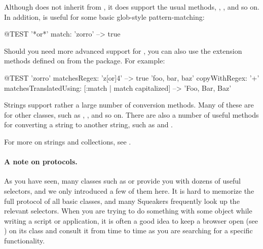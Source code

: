 \documentclass[a4paper,10pt,twoside]{book}
\begin{document}

Although  does not inherit from , it does support the usual  methods, \ct{<}, \ct{=}, and so on.
In addition,  is useful for some basic glob-style pattern-matching:

\begin{code}{@TEST}
'*or*' match: 'zorro' --> true
\end{code}

Should you need more advanced support for , you can also use the  extension methods defined on  from the  package.
For example:

\begin{code}{@TEST}
'zorro' matchesRegex: 'z[or]{4}' --> true
'foo, bar, baz' copyWithRegex: '\w+' matchesTranslatedUsing: [:match | match capitalized] --> 'Foo, Bar, Baz'
\end{code}

Strings support rather a large number of conversion methods.
Many of these are  for other classes, such as , , and so on.
There are also a number of useful methods for converting a string to another string, such as  and .

For more on strings and collections, see .



\paragraph{A note on protocols.}

As you have seen, many classes such as  or  provide you with dozens of useful selectors, and we only introduced a few of them here.
It is hard to memorize the full protocol of all basic classes, and many Squeakers frequently look up the relevant selectors.
When you are trying to do something with some object while writing a script or application, it is often a good idea to keep a  browser open (see ) on its class and consult it from time to time as you are searching for a specific functionality.
\end{document}

